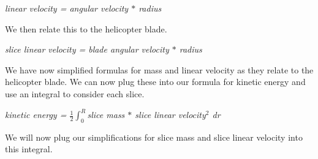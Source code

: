 \documentclass[a4paper, 11pt, oneside]{book} %
\begin{document}
\vspace{0.5\baselineskip} %
\vspace{0.5\baselineskip} %

\textit{linear velocity = angular velocity $*$ radius}\\

\vspace{0.5\baselineskip} %
\vspace{0.5\baselineskip} %

We then relate this to the helicopter blade.\\

\vspace{0.5\baselineskip} %
\vspace{0.5\baselineskip} %

\textit{slice linear velocity = blade angular velocity $*$ radius}\\

\vspace{0.5\baselineskip} %
\vspace{0.5\baselineskip} %

We have now simplified formulas for mass and linear velocity as they relate to the helicopter blade. We can now plug these into our formula for kinetic energy and use an integral to consider each slice.\\

\vspace{0.5\baselineskip} %
\vspace{0.5\baselineskip} %

\textit{kinetic energy = $\frac{1}{2} \int_{0}^{R}$slice mass $*$ slice linear velocity$^2$ dr}\\

\vspace{0.5\baselineskip} %
\vspace{0.5\baselineskip} %

We will now plug our simplifications for slice mass and slice linear velocity into this integral.\\

\vspace{0.5\baselineskip} %
\vspace{0.5\baselineskip} %
\end{document}
